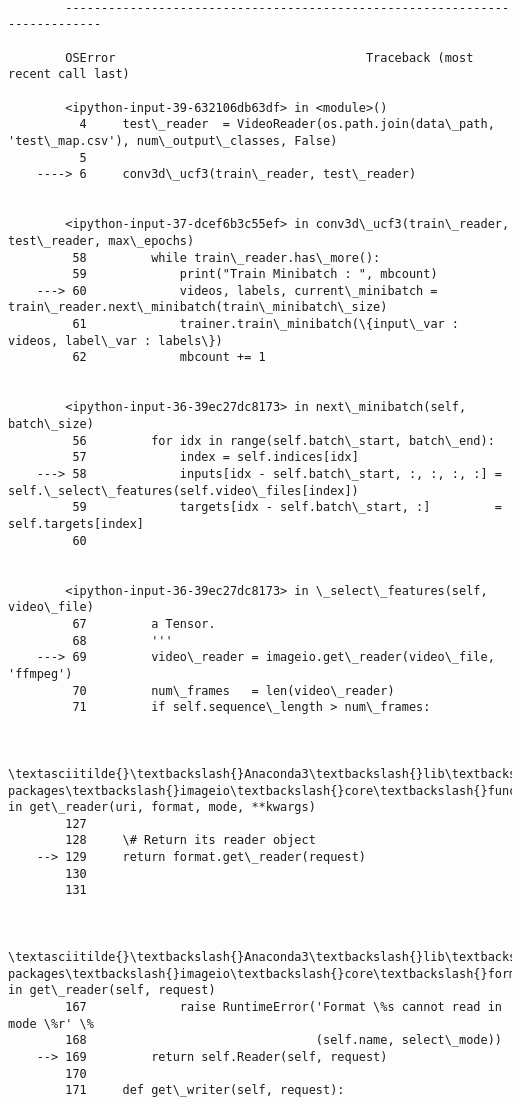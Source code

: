 \documentclass[11pt]{article}
\begin{document}
    \begin{Verbatim}[commandchars=\\\{\}]

        ---------------------------------------------------------------------------

        OSError                                   Traceback (most recent call last)

        <ipython-input-39-632106db63df> in <module>()
          4     test\_reader  = VideoReader(os.path.join(data\_path, 'test\_map.csv'), num\_output\_classes, False)
          5 
    ----> 6     conv3d\_ucf3(train\_reader, test\_reader)
    

        <ipython-input-37-dcef6b3c55ef> in conv3d\_ucf3(train\_reader, test\_reader, max\_epochs)
         58         while train\_reader.has\_more():
         59             print("Train Minibatch : ", mbcount)
    ---> 60             videos, labels, current\_minibatch = train\_reader.next\_minibatch(train\_minibatch\_size)
         61             trainer.train\_minibatch(\{input\_var : videos, label\_var : labels\})
         62             mbcount += 1
    

        <ipython-input-36-39ec27dc8173> in next\_minibatch(self, batch\_size)
         56         for idx in range(self.batch\_start, batch\_end):
         57             index = self.indices[idx]
    ---> 58             inputs[idx - self.batch\_start, :, :, :, :] = self.\_select\_features(self.video\_files[index])
         59             targets[idx - self.batch\_start, :]         = self.targets[index]
         60 
    

        <ipython-input-36-39ec27dc8173> in \_select\_features(self, video\_file)
         67         a Tensor.
         68         '''
    ---> 69         video\_reader = imageio.get\_reader(video\_file, 'ffmpeg')
         70         num\_frames   = len(video\_reader)
         71         if self.sequence\_length > num\_frames:
    

        \textasciitilde{}\textbackslash{}Anaconda3\textbackslash{}lib\textbackslash{}site-packages\textbackslash{}imageio\textbackslash{}core\textbackslash{}functions.py in get\_reader(uri, format, mode, **kwargs)
        127 
        128     \# Return its reader object
    --> 129     return format.get\_reader(request)
        130 
        131 
    

        \textasciitilde{}\textbackslash{}Anaconda3\textbackslash{}lib\textbackslash{}site-packages\textbackslash{}imageio\textbackslash{}core\textbackslash{}format.py in get\_reader(self, request)
        167             raise RuntimeError('Format \%s cannot read in mode \%r' \% 
        168                                (self.name, select\_mode))
    --> 169         return self.Reader(self, request)
        170 
        171     def get\_writer(self, request):
    


\end{Verbatim}
\end{document}
